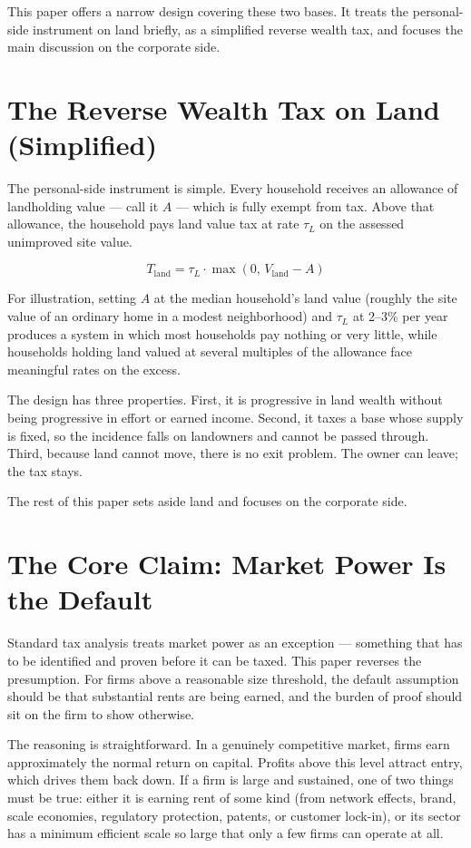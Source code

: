 \documentclass[11pt,a4paper]{article}
\begin{document}
This paper offers a narrow design covering these two bases. It treats the personal-side instrument on land briefly, as a simplified reverse wealth tax, and focuses the main discussion on the corporate side.

\section{The Reverse Wealth Tax on Land (Simplified)}

The personal-side instrument is simple. Every household receives an allowance of landholding value — call it $A$ — which is fully exempt from tax. Above that allowance, the household pays land value tax at rate $\tau_L$ on the assessed unimproved site value.

\[
T_{\text{land}} = \tau_L \cdot \max(0, \, V_{\text{land}} - A)
\]

For illustration, setting $A$ at the median household's land value (roughly the site value of an ordinary home in a modest neighborhood) and $\tau_L$ at 2--3\% per year produces a system in which most households pay nothing or very little, while households holding land valued at several multiples of the allowance face meaningful rates on the excess.

The design has three properties. First, it is progressive in land wealth without being progressive in effort or earned income. Second, it taxes a base whose supply is fixed, so the incidence falls on landowners and cannot be passed through. Third, because land cannot move, there is no exit problem. The owner can leave; the tax stays.

The rest of this paper sets aside land and focuses on the corporate side.

\section{The Core Claim: Market Power Is the Default}

Standard tax analysis treats market power as an exception — something that has to be identified and proven before it can be taxed. This paper reverses the presumption. For firms above a reasonable size threshold, the default assumption should be that substantial rents are being earned, and the burden of proof should sit on the firm to show otherwise.

The reasoning is straightforward. In a genuinely competitive market, firms earn approximately the normal return on capital. Profits above this level attract entry, which drives them back down. If a firm is large and sustained, one of two things must be true: either it is earning rent of some kind (from network effects, brand, scale economies, regulatory protection, patents, or customer lock-in), or its sector has a minimum efficient scale so large that only a few firms can operate at all.
\end{document}
